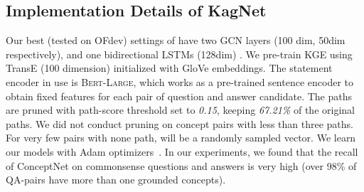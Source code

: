 \documentclass[11pt,a4paper]{article}
\begin{document}
\begin{table}[t]

	\centering

\caption{Comparison with official benchmark baseline methods using the official split on the leaderboard. \vspace{0pt}}
\label{tab:OFres}
\end{table}
\subsection{Implementation Details of KagNet}
\label{sec:detail}
Our best (tested on OFdev) settings of \KagNet have two GCN layers (100 dim, 50dim respectively), and one bidirectional LSTMs (128dim)
. We pre-train KGE
using TransE (100 dimension) initialized with GloVe embeddings. The statement encoder in use is \textsc{Bert-Large}, which works as a pre-trained sentence encoder to obtain fixed features for each pair of question and answer candidate.
The paths are pruned with path-score threshold set to \textit{0.15}, keeping \textit{67.21\%} of the original paths.
We did not conduct pruning on concept pairs with less than three paths. 
For very few pairs with none path,  will be a randomly sampled vector. 
We learn our \KagNet models with Adam optimizers~\cite{Kingma2015AdamAM}.
In our experiments, we found that the recall of ConceptNet on commonsense questions and answers is very high (over 98\% of QA-pairs have more than one grounded concepts). 
\end{document}
